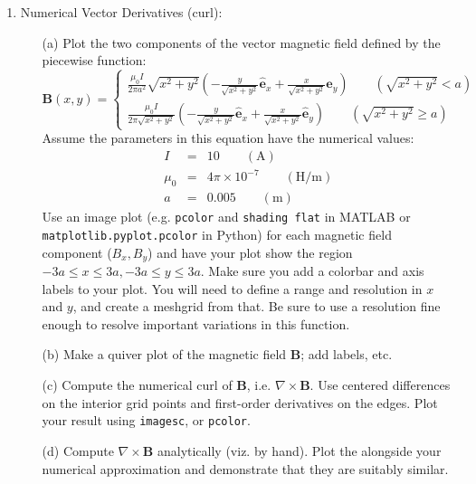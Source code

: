\documentclass{article}
\begin{document}
\begin{enumerate}
  \item  Numerical Vector Derivatives (curl):  
  \begin{itemize}  
    \item[(a)] Plot the two components of the vector magnetic field defined by the piecewise function:
    \begin{equation}
      \mathbf{B}(x,y)= \left\{
      \begin{array}{c}
      \frac{\mu_0 I}{2 \pi a^2} \sqrt{x^2+y^2} \left( - \frac{y}{\sqrt{x^2+y^2}}\hat{\mathbf{e}}_x + \frac{x}{\sqrt{x^2+y^2}} \hat{\mathbf{e}}_y \right) \qquad \left( \sqrt{x^2+y^2} < a \right)
      \\
      \frac{\mu_0 I}{2 \pi \sqrt{x^2+y^2}} \left( - \frac{y}{\sqrt{x^2+y^2}} \hat{\mathbf{e}}_x + \frac{x}{\sqrt{x^2+y^2}} \hat{\mathbf{e}}_y \right) \qquad \left( \sqrt{x^2+y^2} \ge a \right)
      \end{array}
      \right.      
    \end{equation}
    Assume the parameters in this equation have the numerical values:
    \begin{eqnarray}
      I &=& 10 \qquad \left( \mathrm{A} \right) \nonumber \\
      \mu_0 &=& 4 \pi \times 10^{-7} \qquad (\mathrm{H/m}) \nonumber \\
      a &=& 0.005 \qquad (\mathrm{m}) \nonumber 
    \end{eqnarray}
    Use an image plot (e.g. \texttt{pcolor} and \texttt{shading flat} in MATLAB or \texttt{matplotlib.pyplot.pcolor} in Python) for each magnetic field component ($B_x,B_y$) and have your plot show the region $-3 a \le x \le 3 a, -3a \le y \le 3a$.  Make sure you add a colorbar and axis labels to your plot.  You will need to define a range and resolution in $x$ and $y$, and create a meshgrid from that.  Be sure to use a resolution fine enough to resolve important variations in this function.  
    \item[(b)]  Make a quiver plot of the magnetic field $\mathbf{B}$; add labels, etc.
    \item[(c)]  Compute the numerical curl of $\mathbf{B}$, i.e. $\nabla \times \mathbf{B}$.  Use centered differences on the interior grid points and first-order derivatives on the edges.  Plot your result using \texttt{imagesc}, or \texttt{pcolor}.  
    \item[(d)]  Compute $\nabla \times \mathbf{B}$ analytically (viz. by hand).  Plot the  alongside your numerical approximation and demonstrate that they are suitably similar. 

\end{itemize}
\end{enumerate}
\end{document}
